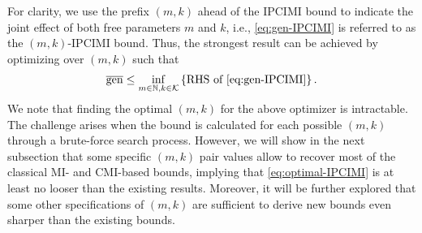 \documentclass[onecolumn,romanappendices,10pt]{IEEEtran}
\newcommand{\Kcal}{{\mathcal K}}
\newcommand{\NN}{{\mathbb{N}}}
\DeclareMathOperator{\gen}{\overline{gen}}
\begin{document}
	For clarity, we use the prefix $(m ,k)$ ahead of the IPCIMI bound to indicate the joint effect of both free parameters $m$ and $k$, i.e., \eqref{eq:gen-IPCIMI} is referred to as the $(m ,k)$-IPCIMI bound. Thus, the strongest result can be achieved by optimizing over $(m,k)$ such that
	\begin{align}
		\gen \leq \inf_{m \in \NN, k \in \Kcal} \left\{ \textnormal{RHS of \eqref{eq:gen-IPCIMI}} \right\}. \label{eq:optimal-IPCIMI}
	\end{align}
	We note that finding the optimal $(m, k)$ for the above optimizer is intractable. The challenge arises when the bound is calculated for each possible $(m, k)$ through a brute-force search process. However, we will show in the next subsection that some specific $(m, k)$ pair values allow to recover most of the classical MI- and CMI-based bounds, implying that \eqref{eq:optimal-IPCIMI} is at least no looser than the existing results. Moreover, it will be further explored that some other specifications of $(m, k)$ are sufficient to derive new bounds even sharper than the existing bounds.
	
\end{document}
